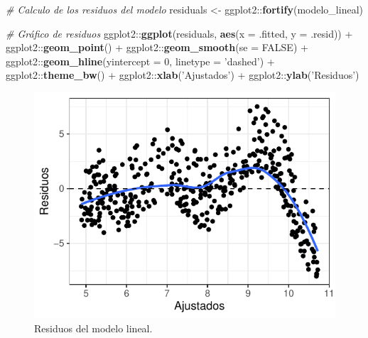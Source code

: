 \documentclass[
  12pt]{article}
\newenvironment{Shaded}{}{}
\newcommand{\CommentTok}[1]{\textcolor[rgb]{0.38,0.63,0.69}{\textit{#1}}}
\newcommand{\DataTypeTok}[1]{\textcolor[rgb]{0.56,0.13,0.00}{#1}}
\newcommand{\DecValTok}[1]{\textcolor[rgb]{0.25,0.63,0.44}{#1}}
\newcommand{\KeywordTok}[1]{\textcolor[rgb]{0.00,0.44,0.13}{\textbf{#1}}}
\newcommand{\NormalTok}[1]{#1}
\newcommand{\OperatorTok}[1]{\textcolor[rgb]{0.40,0.40,0.40}{#1}}
\newcommand{\OtherTok}[1]{\textcolor[rgb]{0.00,0.44,0.13}{#1}}
\newcommand{\StringTok}[1]{\textcolor[rgb]{0.25,0.44,0.63}{#1}}
\begin{document}
\begin{Shaded}
\begin{Highlighting}[]
\CommentTok{# Calculo de los residuos del modelo}
\NormalTok{residuals <-}\StringTok{ }\NormalTok{ggplot2}\OperatorTok{::}\KeywordTok{fortify}\NormalTok{(modelo_lineal)}

\CommentTok{# Gráfico de residuos}
\NormalTok{ggplot2}\OperatorTok{::}\KeywordTok{ggplot}\NormalTok{(residuals, }\KeywordTok{aes}\NormalTok{(}\DataTypeTok{x =}\NormalTok{ .fitted, }\DataTypeTok{y =}\NormalTok{ .resid)) }\OperatorTok{+}\StringTok{ }
\StringTok{  }\NormalTok{ggplot2}\OperatorTok{::}\KeywordTok{geom_point}\NormalTok{() }\OperatorTok{+}
\StringTok{  }\NormalTok{ggplot2}\OperatorTok{::}\KeywordTok{geom_smooth}\NormalTok{(}\DataTypeTok{se =} \OtherTok{FALSE}\NormalTok{) }\OperatorTok{+}
\StringTok{  }\NormalTok{ggplot2}\OperatorTok{::}\KeywordTok{geom_hline}\NormalTok{(}\DataTypeTok{yintercept =} \DecValTok{0}\NormalTok{, }\DataTypeTok{linetype =} \StringTok{'dashed'}\NormalTok{) }\OperatorTok{+}
\StringTok{  }\NormalTok{ggplot2}\OperatorTok{::}\KeywordTok{theme_bw}\NormalTok{() }\OperatorTok{+}
\StringTok{  }\NormalTok{ggplot2}\OperatorTok{::}\KeywordTok{xlab}\NormalTok{(}\StringTok{'Ajustados'}\NormalTok{) }\OperatorTok{+}\StringTok{ }\NormalTok{ggplot2}\OperatorTok{::}\KeywordTok{ylab}\NormalTok{(}\StringTok{'Residuos'}\NormalTok{)}
\end{Highlighting}
\end{Shaded}

\begin{figure}[H]

{\centering \includegraphics{Manual_Generador_files/figure-latex/residuos-lineal-1} 

}

\caption{Residuos del modelo lineal.}\label{fig:residuos-lineal}
\end{figure}
\end{document}
